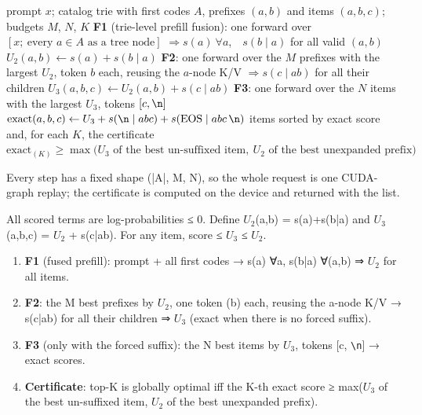 \documentclass[11pt]{article}
\newcommand{\nl}{\texttt{\textbackslash n}}
\begin{document}
\begin{algorithm}[!htb]
\caption{Certified exact top-$K$ decoding of one request. Every step has a fixed shape ($|A|$, $M$, $N$),
so the request is one CUDA-graph replay; the certificate is computed on the device and returned with the list.}
\label{alg:certified}
\begin{algorithmic}[1]
\Require prompt $x$; catalog trie with first codes $A$, prefixes $(a,b)$ and items $(a,b,c)$; budgets $M$, $N$, $K$
\State \textbf{F1} (trie-level prefill fusion): one forward over $[x;\ \text{every } a \in A \text{ as a tree node}]$
  $\Rightarrow s(a)\ \forall a$,\ \ $s(b \mid a)$ for all valid $(a,b)$
\State $U_2(a,b) \gets s(a) + s(b \mid a)$ 
\State \textbf{F2}: one forward over the $M$ prefixes with the largest $U_2$, token $b$ each, reusing the $a$-node K/V
  $\Rightarrow s(c \mid ab)$ for all their children
\State $U_3(a,b,c) \gets U_2(a,b) + s(c \mid ab)$ 
  \State \textbf{F3}: one forward over the $N$ items with the largest $U_3$, tokens $[c, \text{\nl}]$
  \State $\mathrm{exact}(a,b,c) \gets U_3 + s(\text{\nl} \mid abc) + s(\mathrm{EOS} \mid abc\,\text{\nl})$
\EndIf
\State \Return items sorted by exact score and, for each $K$, the certificate
  $\mathrm{exact}_{(K)} \ge \max\bigl(U_3 \text{ of the best un-suffixed item},\ U_2 \text{ of the best unexpanded prefix}\bigr)$
\end{algorithmic}
\end{algorithm}

Every step has a fixed shape (|A|, M, N), so the whole request is one CUDA-graph replay; the certificate is computed on the device and returned with the list.

All scored terms are log-probabilities ≤ 0. Define $U_2$(a,b) = s(a)+s(b|a) and $U_3$(a,b,c) = $U_2$ + s(c|ab). For any item, score ≤ $U_3$ ≤ $U_2$.

\begin{enumerate}
\item \textbf{F1} (fused prefill): prompt + all first codes → s(a) ∀a, s(b|a) ∀(a,b) ⇒ $U_2$ for all items.
\item \textbf{F2}: the M best prefixes by $U_2$, one token (b) each, reusing the a-node K/V → s(c|ab) for all their children ⇒ $U_3$ (exact when there is no forced suffix).
\item \textbf{F3} (only with the forced suffix): the N best items by $U_3$, tokens [c, \nl{}] → exact scores.
\item \textbf{Certificate}: top-K is globally optimal iff the K-th exact score ≥ max($U_3$ of the best un-suffixed item, $U_2$ of the best unexpanded prefix).
\end{enumerate}
\end{document}

